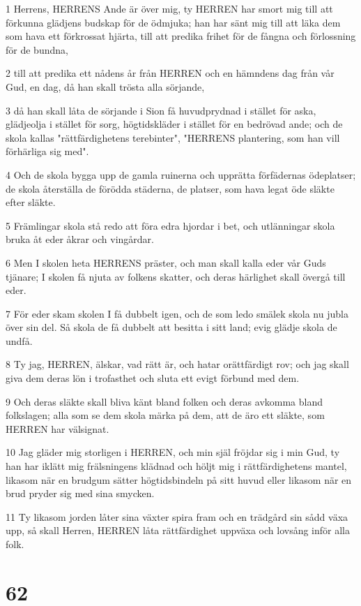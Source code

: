 \par 1 Herrens, HERRENS Ande är över mig, ty HERREN har smort mig till att förkunna glädjens budskap för de ödmjuka; han har sänt mig till att läka dem som hava ett förkrossat hjärta, till att predika frihet för de fångna och förlossning för de bundna,
\par 2 till att predika ett nådens år från HERREN och en hämndens dag från vår Gud, en dag, då han skall trösta alla sörjande,
\par 3 då han skall låta de sörjande i Sion få huvudprydnad i stället för aska, glädjeolja i stället för sorg, högtidskläder i stället för en bedrövad ande; och de skola kallas "rättfärdighetens terebinter", "HERRENS plantering, som han vill förhärliga sig med".
\par 4 Och de skola bygga upp de gamla ruinerna och upprätta förfädernas ödeplatser; de skola återställa de förödda städerna, de platser, som hava legat öde släkte efter släkte.
\par 5 Främlingar skola stå redo att föra edra hjordar i bet, och utlänningar skola bruka åt eder åkrar och vingårdar.
\par 6 Men I skolen heta HERRENS präster, och man skall kalla eder vår Guds tjänare; I skolen få njuta av folkens skatter, och deras härlighet skall övergå till eder.
\par 7 För eder skam skolen I få dubbelt igen, och de som ledo smälek skola nu jubla över sin del. Så skola de få dubbelt att besitta i sitt land; evig glädje skola de undfå.
\par 8 Ty jag, HERREN, älskar, vad rätt är, och hatar orättfärdigt rov; och jag skall giva dem deras lön i trofasthet och sluta ett evigt förbund med dem.
\par 9 Och deras släkte skall bliva känt bland folken och deras avkomma bland folkslagen; alla som se dem skola märka på dem, att de äro ett släkte, som HERREN har välsignat.
\par 10 Jag gläder mig storligen i HERREN, och min själ fröjdar sig i min Gud, ty han har iklätt mig frälsningens klädnad och höljt mig i rättfärdighetens mantel, likasom när en brudgum sätter högtidsbindeln på sitt huvud eller likasom när en brud pryder sig med sina smycken.
\par 11 Ty likasom jorden låter sina växter spira fram och en trädgård sin sådd växa upp, så skall Herren, HERREN låta rättfärdighet uppväxa och lovsång inför alla folk.

\chapter{62}

